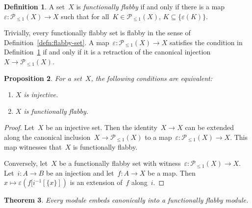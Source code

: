 \documentclass[oneside]{amsart}
\theoremstyle{definition}
\newtheorem{defn}{Definition}[section]
\theoremstyle{plain}
\newtheorem{prop}[defn]{Proposition}
\newtheorem{thm}[defn]{Theorem}
\theoremstyle{remark}
\renewcommand{\P}{\mathcal{P}}
\renewcommand{\_}{\mathpunct{.}\,}
\begin{document}
\begin{defn}\label{defn:functionally-flabby}
A set~$X$ is \emph{functionally flabby} if and only if there is a
map~$\varepsilon : \P_{\leq1}(X) \to X$ such that for all~$K \in
\P_{\leq1}(X)$, $K \subseteq \{ \varepsilon(K) \}$.\end{defn}

Trivially, every functionally flabby set is flabby in the sense of
Definition~\ref{defn:flabby-set}.
A map~$\varepsilon : \P_{\leq1}(X) \to X$ satisfies the condition in
Definition~\ref{defn:functionally-flabby} if and only if it is a retraction of
the canonical injection~$X \to \P_{\leq1}(X)$.

\begin{prop}For a set~$X$, the following conditions are equivalent:
\begin{enumerate}
\item $X$ is injective.
\item $X$ is functionally flabby.
\end{enumerate}
\end{prop}

\begin{proof}Let~$X$ be an injective set. Then the identity~$X \to X$ can be extended
along the canonical inclusion~$X \to \P_{\leq1}(X)$ to a map~$\varepsilon :
\P_{\leq1}(X) \to X$. This map witnesses that~$X$ is functionally flabby.

Conversely, let~$X$ be a functionally flabby set with witness~$\varepsilon :
\P_{\leq1}(X) \to X$. Let~$i : A \to B$ be an injection and let~$f : A \to X$
be a map. Then~$x \mapsto \varepsilon(f[i^{-1}[\{x\}])$ is an extension of~$f$
along~$i$.
\end{proof}

\begin{thm}\label{thm:enough-flabby-modules}
Every module embeds canonically into a functionally flabby module.\end{thm}
\end{document}
